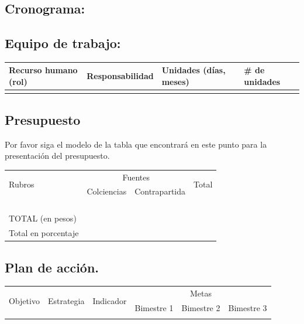 \subsection{Cronograma:                                    }

\subsection{Equipo de trabajo:}
\begin{tabular}{|l|l|l|l|}\hline
Recurso humano (rol)& Responsabilidad& Unidades (días, meses)& \# de unidades\\\hline
&&&\\\hline
\end{tabular}

\subsection{Presupuesto}
\begin{instrucciones}
  Por favor siga el modelo de la tabla que encontrará en este punto para la presentación del presupuesto.
\end{instrucciones}
\begin{tabular}{|l|l|l|l|}\hline
  \multirow{2}{*}{Rubros}&\multicolumn{2}{c}{Fuentes}\vline&\multirow{2}{*}{Total}\\
  \cline{2-3} & Colciencias & Contrapartida & \\\hline 
 & & &\\\hline
 & & &\\\hline
 & & &\\\hline
 & & &\\\hline
TOTAL (en pesos) & & &\\\hline
Total en porcentaje & & &\\\hline
\end{tabular}

\subsection{Plan de acción.}
\begin{tabular}{|l|l|l|l|l|l|}\hline
  \multirow{2}{*}{Objetivo} & \multirow{2}{*}{Estrategia} & \multirow{2}{*}{Indicador}  & \multicolumn{3}{|c|}{Metas}\\
\cline{4-6} 
& & & Bimestre 1 &Bimestre 2 & Bimestre 3\\\hline 
&&&&&\\\hline
\end{tabular}




